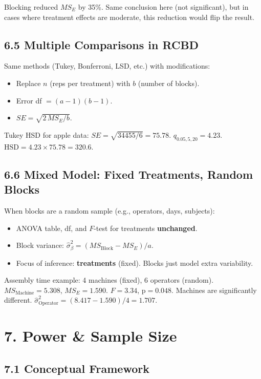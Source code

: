 \documentclass[9pt,letterpaper]{article}
\begin{document}
Blocking reduced $MS_E$ by 35\%. Same conclusion here (not significant), but in cases where treatment effects are moderate, this reduction would flip the result.

\subsection{6.5 Multiple Comparisons in RCBD}

Same methods (Tukey, Bonferroni, LSD, etc.) with modifications:
\begin{itemize}
    \item Replace $n$ (reps per treatment) with $b$ (number of blocks).
    \item Error df $= (a-1)(b-1)$.
    \item $SE = \sqrt{2\,MS_E/b}$.
\end{itemize}

Tukey HSD for apple data: $SE = \sqrt{34455/6} = 75.78$. $q_{0.05,5,20} = 4.23$. $\text{HSD} = 4.23 \times 75.78 = 320.6$.

\subsection{6.6 Mixed Model: Fixed Treatments, Random Blocks}

When blocks are a random sample (e.g., operators, days, subjects):
\begin{itemize}
    \item ANOVA table, df, and $F$-test for treatments \textbf{unchanged}.
    \item Block variance: $\hat\sigma_\beta^2 = (MS_{\text{Block}} - MS_E)/a$.
    \item Focus of inference: \textbf{treatments} (fixed). Blocks just model extra variability.
\end{itemize}

Assembly time example: 4 machines (fixed), 6 operators (random). $MS_{\text{Machine}}=5.308$, $MS_E=1.590$. $F=3.34$, p$=0.048$. Machines are significantly different. $\hat\sigma^2_{\text{Operator}} = (8.417 - 1.590)/4 = 1.707$.

\section{7. Power \& Sample Size}

\subsection{7.1 Conceptual Framework}
\end{document}
